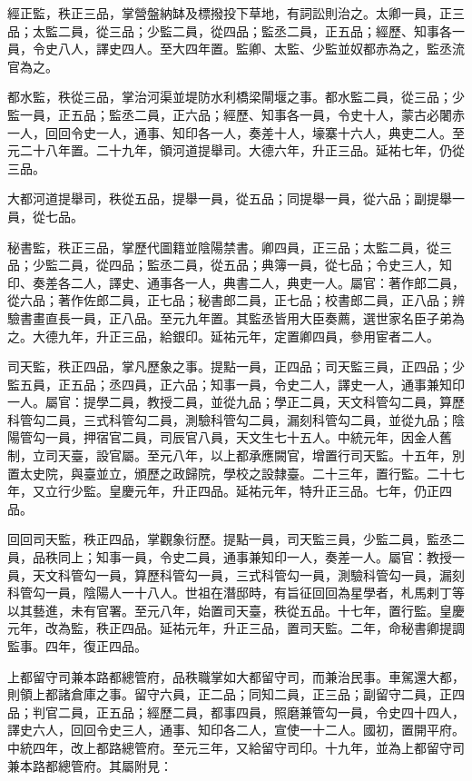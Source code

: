 \begin{pinyinscope}
 經正監，秩正三品，掌營盤納缽及標撥投下草地，有詞訟則治之。太卿一員，正三品；太監二員，從三品；少監二員，從四品；監丞二員，正五品；經歷、知事各一員，令史八人，譯史四人。至大四年置。監卿、太監、少監並奴都赤為之，監丞流官為之。



 都水監，秩從三品，掌治河渠並堤防水利橋梁閘堰之事。都水監二員，從三品；少監一員，正五品；監丞二員，正六品；經歷、知事各一員，令史十人，蒙古必闍赤一人，回回令史一人，通事、知印各一人，奏差十人，壕寨十六人，典吏二人。至元二十八年置。二十九年，領河道提舉司。大德六年，升正三品。延祐七年，仍從三品。



 大都河道提舉司，秩從五品，提舉一員，從五品；同提舉一員，從六品；副提舉一員，從七品。



 秘書監，秩正三品，掌歷代圖籍並陰陽禁書。卿四員，正三品；太監二員，從三品；少監二員，從四品；監丞二員，從五品；典簿一員，從七品；令史三人，知印、奏差各二人，譯史、通事各一人，典書二人，典吏一人。屬官：著作郎二員，從六品；著作佐郎二員，正七品；秘書郎二員，正七品；校書郎二員，正八品；辨驗書畫直長一員，正八品。至元九年置。其監丞皆用大臣奏薦，選世家名臣子弟為之。大德九年，升正三品，給銀印。延祐元年，定置卿四員，參用宦者二人。



 司天監，秩正四品，掌凡歷象之事。提點一員，正四品；司天監三員，正四品；少監五員，正五品；丞四員，正六品；知事一員，令史二人，譯史一人，通事兼知印一人。屬官：提學二員，教授二員，並從九品；學正二員，天文科管勾二員，算歷科管勾二員，三式科管勾二員，測驗科管勾二員，漏刻科管勾二員，並從九品；陰陽管勾一員，押宿官二員，司辰官八員，天文生七十五人。中統元年，因金人舊制，立司天臺，設官屬。至元八年，以上都承應闕官，增置行司天監。十五年，別置太史院，與臺並立，頒歷之政歸院，學校之設隸臺。二十三年，置行監。二十七年，又立行少監。皇慶元年，升正四品。延祐元年，特升正三品。七年，仍正四品。



 回回司天監，秩正四品，掌觀象衍歷。提點一員，司天監三員，少監二員，監丞二員，品秩同上；知事一員，令史二員，通事兼知印一人，奏差一人。屬官：教授一員，天文科管勾一員，算歷科管勾一員，三式科管勾一員，測驗科管勾一員，漏刻科管勾一員，陰陽人一十八人。世祖在潛邸時，有旨征回回為星學者，札馬剌丁等以其藝進，未有官署。至元八年，始置司天臺，秩從五品。十七年，置行監。皇慶元年，改為監，秩正四品。延祐元年，升正三品，置司天監。二年，命秘書卿提調監事。四年，復正四品。



 上都留守司兼本路都總管府，品秩職掌如大都留守司，而兼治民事。車駕還大都，則領上都諸倉庫之事。留守六員，正二品；同知二員，正三品；副留守二員，正四品；判官二員，正五品；經歷二員，都事四員，照磨兼管勾一員，令史四十四人，譯史六人，回回令史三人，通事、知印各二人，宣使一十二人。國初，置開平府。中統四年，改上都路總管府。至元三年，又給留守司印。十九年，並為上都留守司兼本路都總管府。其屬附見：




\end{pinyinscope}
